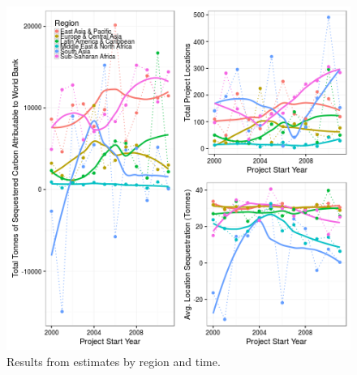 \documentclass{article}\usepackage[]{graphicx}\usepackage[]{color}
\newenvironment{knitrout}{}{}  %
\begin{document}
\begin{knitrout}
\begin{figure}
\centering
 \includegraphics{result_disag.png}
\caption{Results from estimates by region and time.}
\label{result_fig}
\vspace{10pt}
\end{figure}  



\end{knitrout}
\end{document}

